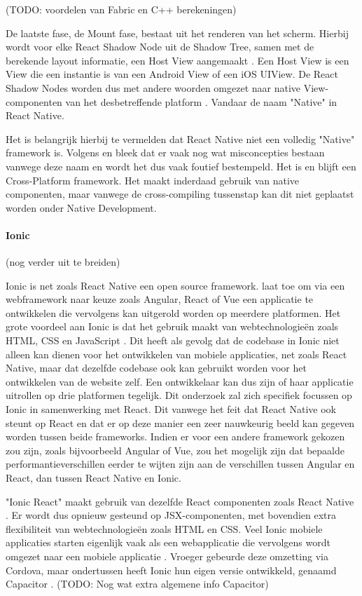 (TODO: voordelen van Fabric en C++ berekeningen)

De laatste fase, de Mount fase, bestaat uit het renderen van het scherm. Hierbij wordt voor elke React Shadow Node uit de Shadow Tree, samen met de berekende layout informatie, een Host View aangemaakt \autocite{Bron15}. Een Host View is een View die een instantie is van een Android View of een iOS UIView. De React Shadow Nodes worden dus met andere woorden omgezet naar native View-componenten van het desbetreffende platform \autocite{Bron15}. Vandaar de naam "Native" in React Native.

Het is belangrijk hierbij te vermelden dat React Native niet een volledig "Native" framework is. Volgens \autocite{Bron3} en \autocite{Bron2} bleek dat er vaak nog wat misconcepties bestaan vanwege deze naam en wordt het dus vaak foutief bestempeld. Het is en blijft een Cross-Platform framework. Het maakt inderdaad gebruik van native componenten, maar vanwege de cross-compiling tussenstap kan dit niet geplaatst worden onder Native Development.

\paragraph{Ionic}

(nog verder uit te breiden)

Ionic is net zoals React Native een open source framework. \textcite{Bron8} laat toe om via een webframework naar keuze zoals Angular, React of Vue een applicatie te ontwikkelen die vervolgens kan uitgerold worden op meerdere platformen. Het grote voordeel aan Ionic is dat het gebruik maakt van webtechnologieën zoals HTML, CSS en JavaScript \autocite{Bron8}. Dit heeft als gevolg dat de codebase in Ionic niet alleen kan dienen voor het ontwikkelen van mobiele applicaties, net zoals React Native, maar dat dezelfde codebase ook kan gebruikt worden voor het ontwikkelen van de website zelf. Een ontwikkelaar kan dus zijn of haar applicatie uitrollen op drie platformen tegelijk. Dit onderzoek zal zich specifiek focussen op Ionic in samenwerking met React. Dit vanwege het feit dat React Native ook steunt op React en dat er op deze manier een zeer nauwkeurig beeld kan gegeven worden tussen beide frameworks. Indien er voor een andere framework gekozen zou zijn, zoals bijvoorbeeld Angular of Vue, zou het mogelijk zijn dat bepaalde performantieverschillen eerder te wijten zijn aan de verschillen tussen Angular en React, dan tussen React Native en Ionic.

"Ionic React" maakt gebruik van dezelfde React componenten zoals React Native \autocite{Bron8}. Er wordt dus opnieuw gesteund op JSX-componenten, met bovendien extra flexibiliteit van webtechnologieën zoals HTML en CSS. Veel Ionic mobiele applicaties starten eigenlijk vaak als een webapplicatie die vervolgens wordt omgezet naar een mobiele applicatie \autocite{Bron19}. Vroeger gebeurde deze omzetting via Cordova, maar ondertussen heeft Ionic hun eigen versie ontwikkeld, genaamd Capacitor \autocite{Bron19}. (TODO: Nog wat extra algemene info Capacitor)


